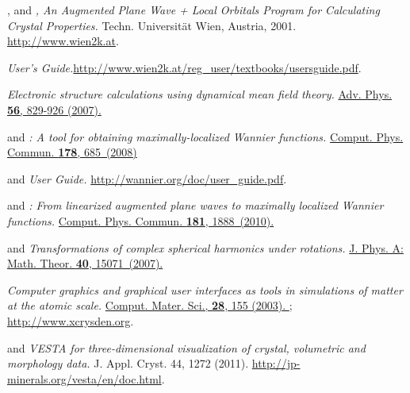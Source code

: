 \begin{thebibliography}{88}
  , and
  \textit{\Wien, An Augmented Plane Wave + Local Orbitals Program for
    Calculating Crystal Properties.}
  Techn. Universität Wien, Austria, 2001.
  \url{http://www.wien2k.at}.

  \textit{\Wien User's Guide.}\linebreak[4]
  \url{http://www.wien2k.at/reg_user/textbooks/usersguide.pdf}.

  \textit{Electronic structure calculations using dynamical mean field
    theory.}
  \href{http://www.tandfonline.com/doi/abs/10.1080/00018730701619647}{%
    Adv. Phys. {\bf 56}, 829-926 (2007).
  }

  and \linebreak[4]
  \textit{\wannier: A tool for obtaining maximally-localized Wannier
    functions.}
  \href{http://www.sciencedirect.com/science/article/pii/S0010465507004936}{%
    Comput. Phys. Commun. \textbf{178}, 685~(2008)
  }

   and \linebreak[4]
  \textit{\Wannier User Guide.}
  \url{http://wannier.org/doc/user_guide.pdf}.

  and 
  \textit{\Wtow: From linearized augmented plane waves to maximally
    localized Wannier functions.}
  \href{http://www.sciencedirect.com/science/article/pii/S0010465510002948}{%
    Comput. Phys. Commun. \textbf{181}, 1888~(2010).%
  }

   and 
  \textit{Transformations of complex spherical harmonics under
    rotations.}
  \href{http://iopscience.iop.org/1751-8121/40/50/011}{%
    J. Phys. A: Math. Theor. \textbf{40}, 15071~(2007).%
  }

  \textit{Computer graphics and graphical user interfaces as tools in
    simulations of matter at the atomic scale.}
  \href{http://www.sciencedirect.com/science/article/pii/S0927025603001046}{%
    Comput. Mater. Sci., {\bf 28}, 155 (2003).%
  }; \url{http://www.xcrysden.org}.

   and 
  \textit{VESTA  for three-dimensional visualization of
    crystal, volumetric and morphology data.}
  J. Appl. Cryst. 44, 1272 (2011).
  \url{http://jp-minerals.org/vesta/en/doc.html}.

\end{thebibliography}


